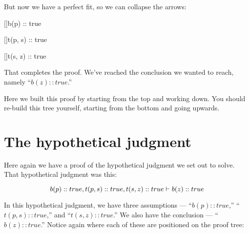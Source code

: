 \documentclass[../../../main.tex]{subfiles}
\begin{document}
\noindent
But now we have a perfect fit, so we can collapse the arrows:


\begin{prooftree*}
  \hypo{}
  []{b(p) :: true}
  
  \hypo{}
  []{t(p, s) :: true}

    
  \hypo{}
  []{t(s, z) :: true}

  
\end{prooftree*}

\noindent
That completes the proof. We've reached the conclusion we wanted to reach, namely ``$b(z) :: true$.'' 

Here we built this proof by starting from the top and working down. You should re-build this tree yourself, starting from the bottom and going upwards. 


\section{The hypothetical judgment}

Here again we have a proof of the hypothetical judgment we set out to solve. That hypothetical judgment was this:

\begin{equation*}
  b(p) :: true, t(p, s) :: true, t(s, z) :: true \ndturnstile/ b(z) :: true
\end{equation*}

\noindent
In this hypothetical judgment, we have three assumptions --- ``$b(p) :: true$,'' ``$t(p, s) :: true$,'' and ``$t(s, z) :: true$.'' We also have the conclusion --- ``$b(z) :: true$.'' Notice again where each of these are positioned on the proof tree:
\end{document}
